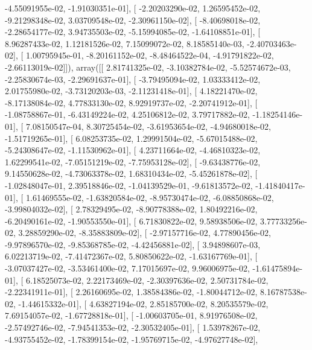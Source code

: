 \documentclass{article}
\begin{document}
         -4.55091955e-02,  -1.91030351e-01],
       [ -2.20203290e-02,   1.26595452e-02,  -9.21298348e-02,
          3.03709548e-02,  -2.30961150e-02],
       [ -8.40698018e-02,  -2.28654177e-02,   3.94735503e-02,
         -5.15994085e-02,  -1.64108851e-01],
       [  8.96287433e-02,   1.12181526e-02,   7.15099072e-02,
          8.18585140e-03,  -2.40703463e-02],
       [  1.00795945e-01,  -8.20161152e-02,  -8.48464522e-04,
         -4.91791822e-02,  -2.66113019e-02]]), array([[  2.81741325e-02,  -3.10382784e-02,  -5.52574672e-03,
         -2.25830674e-03,  -2.29691637e-01],
       [ -3.79495094e-02,   1.03333412e-02,   2.01755980e-02,
         -3.73120203e-03,  -2.11231418e-01],
       [  4.18221470e-02,  -8.17138084e-02,   4.77833130e-02,
          8.92919737e-02,  -2.20741912e-01],
       [ -1.08758867e-01,  -6.43149224e-02,   4.25106812e-02,
          3.79717882e-02,  -1.18254146e-01],
       [  7.08150547e-04,   8.30725454e-02,  -3.61953654e-02,
         -4.94680018e-02,  -1.51719265e-01],
       [  6.08253735e-02,   1.29991504e-02,  -5.67015488e-02,
         -5.24308647e-02,  -1.11530962e-01],
       [  4.23711664e-02,  -4.46810323e-02,   1.62299541e-02,
         -7.05151219e-02,  -7.75953128e-02],
       [ -9.63438776e-02,   9.14550628e-02,  -4.73063378e-02,
          1.68310434e-02,  -5.45261878e-02],
       [ -1.02848047e-01,   2.39518846e-02,  -1.04139529e-01,
         -9.61813572e-02,  -1.41840417e-01],
       [  1.61469555e-02,  -1.63820584e-02,  -8.95730474e-02,
         -6.08850868e-02,  -3.99804032e-02],
       [  2.78329495e-02,  -8.90778388e-02,   1.80492216e-02,
         -6.20490161e-02,  -1.90553550e-01],
       [  6.71830822e-02,   9.58938506e-02,   3.77733256e-02,
          3.28859290e-02,  -8.35883809e-02],
       [ -2.97157716e-02,   4.77890456e-02,  -9.97896570e-02,
         -9.85368785e-02,  -4.42456881e-02],
       [  3.94898607e-03,   6.02213719e-02,  -7.41472367e-02,
          5.80850622e-02,  -1.63167769e-01],
       [ -3.07037427e-02,  -3.53461400e-02,   7.17015697e-02,
          9.96006975e-02,  -1.61475894e-01],
       [  6.18525073e-02,   2.22173469e-02,  -2.30397636e-02,
          2.50731784e-02,  -2.22341911e-01],
       [  2.26160695e-02,   1.38584386e-02,  -1.80044712e-02,
          8.16787538e-02,  -1.44615332e-01],
       [  4.63827194e-02,   2.85185700e-02,   8.20535579e-02,
          7.69154057e-02,  -1.67728818e-01],
       [ -1.00603705e-01,   8.91976508e-02,  -2.57492746e-02,
         -7.94541353e-02,  -2.30532405e-01],
       [  1.53978267e-02,  -4.93755452e-02,  -1.78399154e-02,
         -1.95769715e-02,  -4.97627748e-02],
\end{document}
